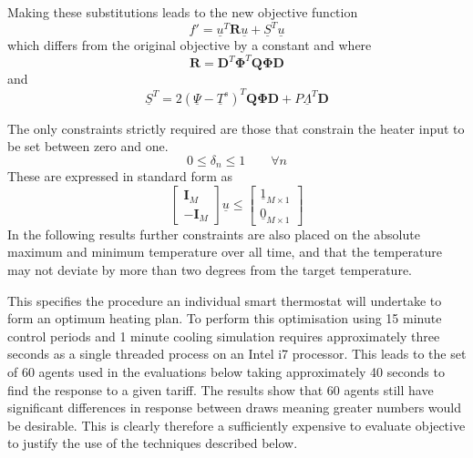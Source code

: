\documentclass[a4paper, 10 pt, conference]{ieeeconf}  %
\begin{document}
Making these substitutions leads to the new objective function
\begin{equation}
f'=\underline{u}^{T}\mathbf{R}\underline{u}+\underline{S}^{T}\underline{u}
\end{equation}
which differs from the original objective by a constant and where
\begin{equation}
\mathbf{R}=\mathbf{D}^{T}\boldsymbol{\Phi}^{T}\mathbf{Q}\boldsymbol{\Phi}\mathbf{D}
\end{equation}
and
\begin{equation}
\underline{S}^{T}=2(\underline{\Psi}-\underline{T}^s)^{T}\mathbf{Q}\boldsymbol{\Phi}\mathbf{D}+P\underline{\Lambda}^{T} \mathbf{D}
\end{equation}

The only constraints strictly required are those that constrain the heater input to be set between zero and one. 
\begin{equation}
0 \leq \delta_{n} \leq 1 \qquad \forall n
\end{equation}
These are expressed in standard form as
\begin{equation}
\left[
\begin{array}{c}
\mathbf{I}_{M} \\ \hline
- \mathbf{I}_{M} 
\end{array}\right]\underline{u} \leq \left[\begin{array}{c}
\underline{1}_{M \times 1} \\ \hline
\underline{0}_{M \times 1}
\end{array}\right]
\end{equation}
In the following results further constraints are also placed on the absolute maximum and minimum temperature over all time, and that the temperature may not deviate by more than two degrees from the target temperature.

This specifies the procedure an individual smart thermostat will undertake to form an optimum heating plan. To perform this optimisation using 15 minute control periods and 1 minute cooling simulation requires approximately three seconds as a single threaded process on an Intel i7 processor. This leads to the set of 60 agents used in the evaluations below taking approximately 40 seconds to find the response to a given tariff. The results show that 60 agents still have significant differences in response between draws meaning greater numbers would be desirable. This is clearly therefore a sufficiently expensive to evaluate objective to justify the use of the techniques described below.
\end{document}

